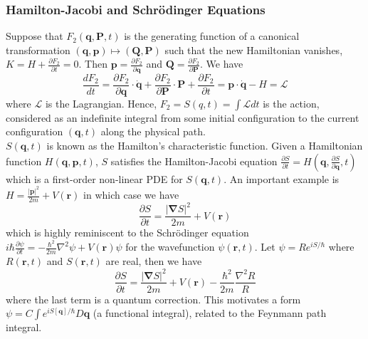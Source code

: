 \documentclass[a4paper]{article}
\theoremstyle{new}
\begin{document}
\subsubsection*{Hamilton-Jacobi and Schr\"{o}dinger Equations}
Suppose that $F_2(\mathbf{q},\mathbf{P},t)$ is the generating function of a canonical transformation $(\mathbf{q},\mathbf{p})\mapsto(\mathbf{Q},\mathbf{P})$ such that the new Hamiltonian vanishes, $K=H+\frac{\partial F_2}{\partial t}=0$. Then $\mathbf{p}=\frac{\partial F_2}{\partial\mathbf{q}}$ and $\mathbf{Q}=\frac{\partial F_2}{\partial\mathbf{P}}$. We have
$$\frac{dF_2}{dt}=\frac{\partial F_2}{\partial\mathbf{q}}\cdot\mathbf{\dot{q}}+\frac{\partial F_2}{\partial\mathbf{P}}\cdot\mathbf{P}+\frac{\partial F_2}{\partial t}=\mathbf{p}\cdot\mathbf{\dot{q}}-H=\mathcal{L}$$
where $\mathcal{L}$ is the Lagrangian. Hence, $F_2=S(q,t)=\int \mathcal{L}dt$ is the action, considered as an indefinite integral from some initial configuration to the current configuration $(\mathbf{q},t)$ along the physical path.\\[5pt]
$S(\mathbf{q},t)$ is known as the Hamilton's characteristic function. Given a Hamiltonian function $H(\mathbf{q},\mathbf{p},t)$, $S$ satisfies the Hamilton-Jacobi equation $\frac{\partial S}{\partial t}=H(\mathbf{q},\frac{\partial S}{\partial\mathbf{q}},t)$ which is a first-order non-linear PDE for $S(\mathbf{q},t)$. An important example is $H=\frac{|\mathbf{p}|^2}{2m}+V(\mathbf{r})$ in which case we have
$$\frac{\partial S}{\partial t}=\frac{|\boldsymbol{\nabla}S|^2}{2m}+V(\mathbf{r})$$
which is highly reminiscent to the Schr\"{o}dinger equation $i\hbar\frac{\partial\psi}{\partial t}=-\frac{\hbar^2}{2m}\nabla^2\psi+V(\mathbf{r})\psi$ for the wavefunction $\psi(\mathbf{r},t)$. Let $\psi=Re^{iS/\hbar}$ where $R(\mathbf{r},t)$ and $S(\mathbf{r},t)$ are real, then we have
$$\frac{\partial S}{\partial t}=\frac{|\boldsymbol{\nabla}S|^2}{2m}+V(\mathbf{r})-\frac{\hbar^2}{2m}\frac{\nabla^2R}{R}$$
where the last term is a quantum correction. This motivates a form $\psi=C\int e^{iS[\mathbf{q}]/\hbar}D\mathbf{q}$ (a functional integral), related to the Feynmann path integral.
\end{document}

